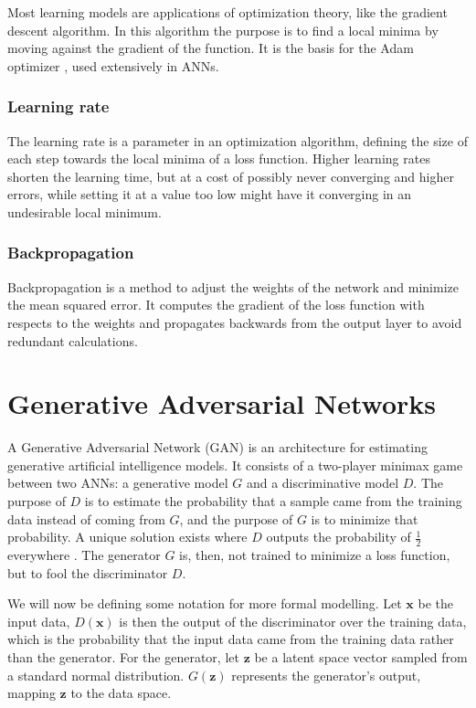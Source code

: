Most learning models are applications of optimization theory, like the gradient descent algorithm. In this algorithm the purpose is to find a local minima by moving against the gradient of the function. It is the basis for the Adam optimizer \cite{kingma2017adam}, used extensively in ANNs.

\subsubsection{Learning rate}

The learning rate is a parameter in an optimization algorithm, defining the size of each step towards the local minima of a loss function. Higher learning rates shorten the learning time, but at a cost of possibly never converging and higher errors, while setting it at a value too low might have it converging in an undesirable local minimum.

\subsubsection{Backpropagation}

Backpropagation is a method to adjust the weights of the network and minimize the mean squared error. It computes the gradient of the loss function with respects to the weights and propagates backwards from the output layer to avoid redundant calculations.

\section{Generative Adversarial Networks}

A Generative Adversarial Network (GAN) is an architecture for estimating generative artificial intelligence models. It consists of a two-player minimax game between two ANNs: a generative model $G$ and a discriminative model $D$. The purpose of $D$ is to estimate the probability that a sample came from the training data instead of coming from $G$, and the purpose of $G$ is to minimize that probability. A unique solution exists where $D$ outputs the probability of $\frac{1}{2}$ everywhere \cite{Goodfellow2014}. The generator $G$ is, then, not trained to minimize a loss function, but to fool the discriminator $D$. 

We will now be defining some notation for more formal modelling. Let $\mathbf{x}$ be the input data, $D(\mathbf{x})$ is then the output of the discriminator over the training data, which is the probability that the input data came from the training data rather than the generator. For the generator, let $\mathbf{z}$ be a latent space vector sampled from a standard normal distribution. $G(\mathbf{z})$ represents the generator's output, mapping $\mathbf{z}$ to the data space.

